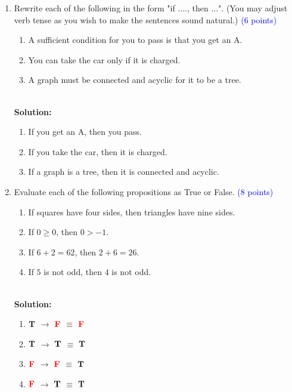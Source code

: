\documentclass{article}
\newcommand{\pt}[1]{\textcolor{blue}{(#1 points)}}
\newenvironment{solution} {
    \par
    \color{blue}
    \vspace{2mm}
    \hline \\
    \textbf{Solution:}
} {
    \vspace{2mm}
    \newpage
}
\newcommand{\T}{\color{black} \textbf{T}}
\newcommand{\F}{\color{red} \textbf{F}}
\begin{document}
\begin{enumerate}

    \item Rewrite each of the following in the form "if ...., then ...".  (You may adjust verb tense as you wish to make the sentences sound natural.) \pt 6
    \begin{enumerate}
        \item A sufficient condition for you to pass is that you get an A.
        \item You can take the car only if it is charged.
        \item A graph must be connected and acyclic for it to be a tree.
    \end{enumerate} 
    
    \begin{solution}
    \begin{enumerate}
        \item If you get an A, then you pass.
        \item If you take the car, then it is charged.
        \item If a graph is a tree, then it is connected and acyclic.
    \end{enumerate}
    \end{solution}
    
    \item Evaluate each of the following propositions as True or False. \pt 8
    \begin{enumerate}
        \item If squares have four sides, then triangles have nine sides.
        \item If $0 \geq 0$, then $0 > -1$.
        \item If $6+2 = 62$, then $2+6=26$.
        \item If $5$ is not odd, then $4$ is not odd. 
    \end{enumerate}
    
    \begin{solution}
    \begin{enumerate}
        \item $\T$ $\rightarrow$ $\F$ $\equiv$ $\F$
        \item $\T$ $\rightarrow$ $\T$ $\equiv$ $\T$
        \item $\F$ $\rightarrow$ $\F$ $\equiv$ $\T$
        \item $\F$ $\rightarrow$ $\T$ $\equiv$ $\T$
    \end{enumerate}
    \end{solution}
    

\end{enumerate}
\end{document}
